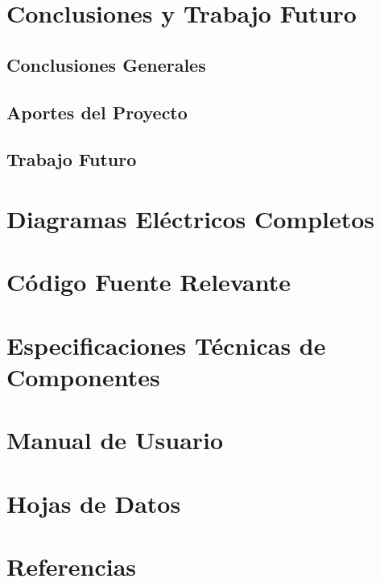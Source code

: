\documentclass[a4paper,12pt]{report}
\begin{document}
\chapter{Conclusiones y Trabajo Futuro}

\section{Conclusiones Generales}




\section{Aportes del Proyecto}



\section{Trabajo Futuro}




\appendix
\chapter{Diagramas Eléctricos Completos}


\chapter{Código Fuente Relevante}


\chapter{Especificaciones Técnicas de Componentes}


\chapter{Manual de Usuario}


\chapter{Hojas de Datos}


\chapter*{Referencias}

\end{document}

